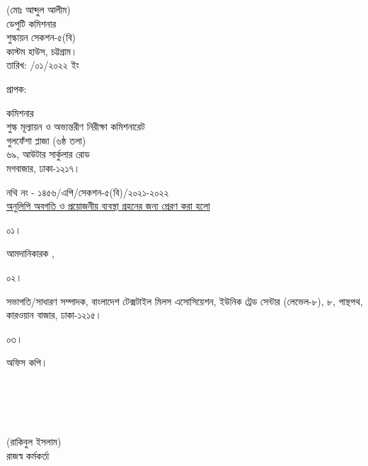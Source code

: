 \documentclass[12pt]{article}
\newcommand{\fileno}{নথি নং - ১৪৫৬/এপি/সেকশন-৫(বি)/২০২১-২০২২}
\newcommand{\impn}{\jsml}
\newcommand{\impadd}{\jsmla}
\newcommand{\rodt}{তারিখ: \hspace{2.0em}/০১/২০২২ ইং}
\begin{document}
\begin{minipage}[t]{0.60\linewidth}
\hspace{1em}
\end{minipage}
\begin{minipage}[t]{0.40\linewidth}
\begin{center}
(মোঃ আব্দুল আলীম)
\\
ডেপুটি কমিশনার
\\
শুল্কায়ন সেকশন-৫(বি)
\\
কাস্টম হাউস, চট্টগ্রাম।
\\
\footnotesize{{\rodt}}
\vspace*{5MM}
\end{center}
\end{minipage}
\begin{minipage}[t]{.07\linewidth}
প্রাপক:
\end{minipage}
\begin{minipage}[t]{.93\linewidth}
কমিশনার
\\
শুল্ক মূল্যায়ন ও অভ্যন্তরীণ নিরীক্ষা কমিশনারেট
\\
গুলফেঁশা প্লাজা (৬ষ্ঠ তলা)
\\
৬৯, আউটার সার্কুলার রোড
\\
মগবাজার, ঢাকা-১২১৭।
\\
\end{minipage}
\footnotesize{{\fileno}}
\\
\underline{\footnotesize{অনুলিপি অবগতি ও প্রয়োজনীয় ব্যবস্থা গ্রহনের জন্য প্রেরণ করা হলো}}
\\
\begin{minipage}[t]{0.06\linewidth}
\footnotesize{০১।}
\end{minipage}
\begin{minipage}[t]{0.94\linewidth}
\footnotesize{
আমদানিকারক {\impn}, {\impadd}
}
\end{minipage}
\begin{minipage}[t]{0.06\linewidth}
\footnotesize{০২।}
\end{minipage}
\begin{minipage}[t]{0.94\linewidth}
সভাপতি/সাধারণ সম্পাদক, বাংলাদেশ টেক্সটাইল
মিলস এসোসিয়েশন, ইউনিক ট্রেড সেন্টার (লেভেল-৮),
৮, পান্থপথ, কারওয়ান বাজার, ঢাকা-১২১৫।
\end{minipage}
\begin{minipage}[t]{0.06\linewidth}
\footnotesize{০৩।}
\end{minipage}
\begin{minipage}[t]{0.94\linewidth}
 অফিস কপি।
 \\
 \\
 \\
 \\
 \\
\end{minipage}
\begin{minipage}[t]{0.60\linewidth}
\hspace{1em}
\end{minipage}
\normalsize
\begin{minipage}[t]{0.40\linewidth}
\begin{center}
(রাকিবুল ইসলাম)
\\
রাজস্ব কর্মকর্তা
\end{center}
\end{minipage}
\thispagestyle{slogan}
\end{document}

